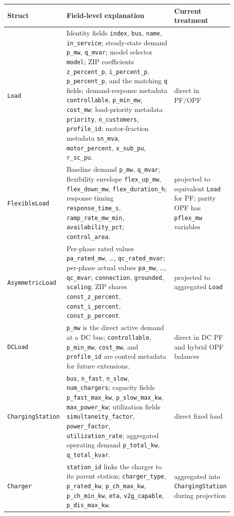 \begin{longtable}{L{0.20\linewidth}L{0.53\linewidth}L{0.19\linewidth}}
\toprule
Struct & Field-level explanation & Current treatment \\
\midrule
\endhead
\texttt{Load} & Identity fields \texttt{index}, \texttt{bus}, \texttt{name}, \texttt{in\_service}; steady-state demand \texttt{p\_mw}, \texttt{q\_mvar}; model selector \texttt{model}; ZIP coefficients \texttt{z\_percent\_p}, \texttt{i\_percent\_p}, \texttt{p\_percent\_p}, and the matching \texttt{q} fields; demand-response metadata \texttt{controllable}, \texttt{p\_min\_mw}, \texttt{cost\_mw}; load-priority metadata \texttt{priority}, \texttt{n\_customers}, \texttt{profile\_id}; motor-fraction metadata \texttt{sn\_mva}, \texttt{motor\_percent}, \texttt{x\_sub\_pu}, \texttt{r\_sc\_pu}. & direct in PF/OPF \\
\texttt{FlexibleLoad} & Baseline demand \texttt{p\_mw}, \texttt{q\_mvar}; flexibility envelope \texttt{flex\_up\_mw}, \texttt{flex\_down\_mw}, \texttt{flex\_duration\_h}; response timing \texttt{response\_time\_s}, \texttt{ramp\_rate\_mw\_min}, \texttt{availability\_pct}; \texttt{control\_area}. & projected to equivalent \texttt{Load} for PF; parity OPF has \texttt{pflex\_mw} variables \\
\texttt{AsymmetricLoad} & Per-phase rated values \texttt{pa\_rated\_mw}, \dots, \texttt{qc\_rated\_mvar}; per-phase actual values \texttt{pa\_mw}, \dots, \texttt{qc\_mvar}; \texttt{connection}, \texttt{grounded}, \texttt{scaling}; ZIP shares \texttt{const\_z\_percent}, \texttt{const\_i\_percent}, \texttt{const\_p\_percent}. & projected to aggregated \texttt{Load} \\
\texttt{DCLoad} & \texttt{p\_mw} is the direct active demand at a DC bus; \texttt{controllable}, \texttt{p\_min\_mw}, \texttt{cost\_mw}, and \texttt{profile\_id} are control metadata for future extensions. & direct in DC PF and hybrid OPF balances \\
\texttt{ChargingStation} & \texttt{bus}, \texttt{n\_fast}, \texttt{n\_slow}, \texttt{num\_chargers}; capacity fields \texttt{p\_fast\_max\_kw}, \texttt{p\_slow\_max\_kw}, \texttt{max\_power\_kw}; utilization fields \texttt{simultaneity\_factor}, \texttt{power\_factor}, \texttt{utilization\_rate}; aggregated operating demand \texttt{p\_total\_kw}, \texttt{q\_total\_kvar}. & direct fixed load \\
\texttt{Charger} & \texttt{station\_id} links the charger to its parent station; \texttt{charger\_type}, \texttt{p\_rated\_kw}, \texttt{p\_ch\_max\_kw}, \texttt{p\_ch\_min\_kw}, \texttt{eta}, \texttt{v2g\_capable}, \texttt{p\_dis\_max\_kw}. & aggregated into \texttt{ChargingStation} during projection \\
\bottomrule
\end{longtable}

